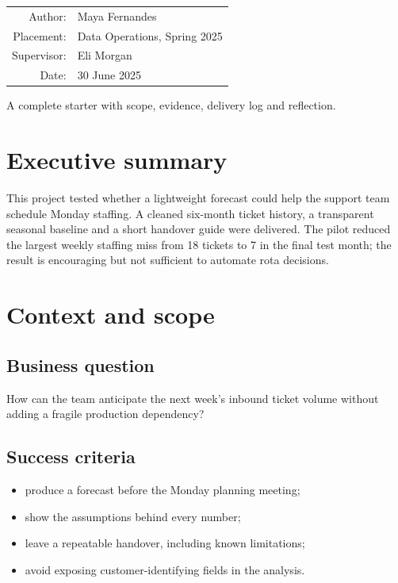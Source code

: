 \documentclass[11pt,a4paper]{report}
\begin{document}
\begin{titlepage}\centering{}\vspace{.5cm}{\Large Internship and company project report\par}\vspace{2cm}{\huge Customer-support forecasting pilot\par}\vfill\begin{tabular}{rl}Author:& Maya Fernandes\\Placement:& Data Operations, Spring 2025\\Supervisor:& Eli Morgan\\Date:& 30 June 2025\end{tabular}\vfill{\small A complete starter with scope, evidence, delivery log and reflection.}\end{titlepage}
\tableofcontents\chapter{Executive summary} This project tested whether a lightweight forecast could help the support team schedule Monday staffing. A cleaned six-month ticket history, a transparent seasonal baseline and a short handover guide were delivered. The pilot reduced the largest weekly staffing miss from 18 tickets to 7 in the final test month; the result is encouraging but not sufficient to automate rota decisions.
\chapter{Context and scope}\section{Business question} How can the team anticipate the next week’s inbound ticket volume without adding a fragile production dependency?\section{Success criteria}\begin{itemize}[leftmargin=*]\item produce a forecast before the Monday planning meeting;\item show the assumptions behind every number;\item leave a repeatable handover, including known limitations;\item avoid exposing customer-identifying fields in the analysis.\end{itemize}
\end{document}
